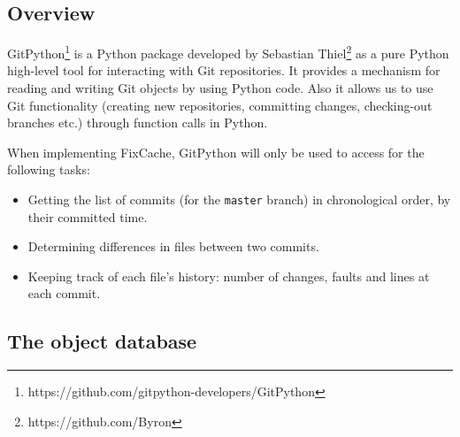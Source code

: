 \documentclass[12pt,twoside,notitlepage]{report}
\newcommand{\fxch}{FixCache}
\begin{document}
\subsection{Overview}
GitPython\footnote{https://github.com/gitpython-developers/GitPython} is a Python package developed by Sebastian Thiel\footnote{https://github.com/Byron} as a pure Python high-level tool for interacting with Git repositories. It provides a mechanism for reading and writing Git objects by using Python code. Also it allows us to use Git functionality (creating new repositories, committing changes, checking-out branches etc.) through function calls in Python.

When implementing \fxch{}, GitPython will only be used to access for the following tasks:
\begin{itemize}
\item Getting the list of commits (for the \texttt{master} branch) in chronological order, by their committed time.
\item Determining differences in files between two commits.
\item Keeping track of each file's history: number of changes, faults and lines at each commit.
\end{itemize}
\subsection{The object database}\label{dbbackend}
\end{document}
